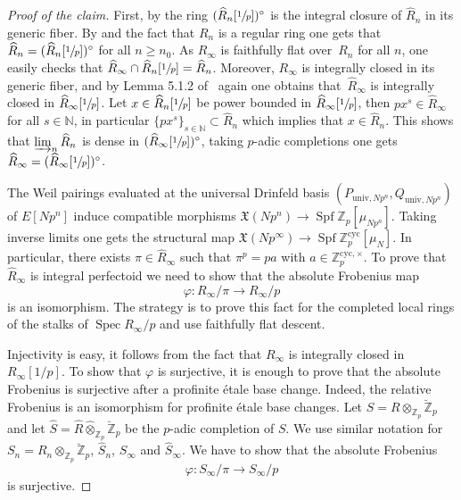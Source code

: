 \documentclass[JEP,XML,SOM,Unicode,published]{cedram}
\newcommand{\cyc}{\mathrm{cyc}}
\newcommand{\univ}{\mathrm{univ}}
\newcommand{\wotimes}{\mathbin{\widehat\otimes}}
\numberwithin{equation}{section}
\theoremstyle{definition}
\newcommand{\bb}[1]{\mathbb{#1}}
\newcommand{\f}[1]{\mathfrak{#1}}
\DeclareMathOperator{\Spf}{Spf}
\DeclareMathOperator{\Spec}{Spec}
\begin{document}
\begin{proof}[Proof of the claim]
First, by \cite[Lem.\,A.2.2.3]{Heuer2019PerfectoidGO} the ring $(\widehat{R}_n[\sfrac{1}{p}])^{\circ}$ is the integral closure of $\widehat{R}_n$ in its generic fiber. By \cite[Lem.\,5.1.2]{BhattLectures} and the fact that $R_n$ is a regular ring one gets that $\widehat{R}_n=(\widehat{R}_n[\sfrac{1}{p}])^{\circ}$ for all $n\geq n_0$. As $R_{\infty}$ is faithfully flat over~$R_n$ for all $n$, one easily checks that $\widehat{R}_{\infty}\cap \widehat{R}_n[\sfrac{1}{p}]=\widehat{R}_{n}$. Moreover, $R_{\infty}$ is integrally closed in its generic fiber, and by Lemma 5.1.2 of \loccit\ again one obtains that~$\widehat{R}_{\infty}$ is integrally closed in $\widehat{R}_{\infty}[\sfrac{1}{p}]$. Let $x\in \widehat{R}_n[\sfrac{1}{p}]$ be power bounded in $\widehat{R}_{\infty}[\sfrac{1}{p}]$, then $px^s\in \widehat{R}_{\infty}$ for all $s\in \bb{N}$, in particular $\{px^s\}_{s\in \bb{N}}\subset \widehat{R}_n$ which implies that $x\in \widehat{R}_n$. This shows that $\varinjlim_{n} \widehat{R}_n$ is dense in $(\widehat{R}_{\infty}[\sfrac{1}{p}])^{\circ}$, taking $p$-adic completions one gets $\widehat{R}_{\infty}=(\widehat{R}_{\infty}[\sfrac{1}{p}])^{\circ}$.

The Weil pairings evaluated at the universal Drinfeld basis $(P_{\univ,Np^n},Q_{\univ,Np^n})$ of $E[Np^n]$ induce compatible morphisms $\f{X}(Np^n)\to \Spf \bb{Z}_p[\mu_{Np^n}]$. Taking inverse limits one gets the structural map $\f{X}(Np^\infty)\to \Spf \bb{Z}_p^{\cyc}[\mu_N]$. In particular, there exists $\pi\in \widehat{R}_{\infty}$ such that $\pi^p=pa$ with $a\in \bb{Z}_p^{\cyc,\times}$. To prove that $\widehat{R}_{\infty}$ is integral perfectoid we need to show that the absolute Frobenius map\vspace*{-3pt}
\[
\varphi: R_{\infty}/\pi \to R_{\infty}/p
\]
is an isomorphism. The strategy is to prove this fact for the completed local rings of the stalks of $\Spec R_{\infty}/p$ and use faithfully flat descent.

Injectivity is easy, it follows from the fact that $R_{\infty}$ is integrally closed in $R_{\infty}[1/p]$. To show that $\varphi$ is surjective, it is enough to prove that the absolute Frobenius is surjective after a profinite étale base change. Indeed, the relative Frobenius is an isomorphism for profinite étale base changes. Let $S= R\otimes_{\bb{Z}_p} \breve{\bb{Z}}_p$ and let $\widehat{S}= \widehat{R}\wotimes_{\bb{Z}_p} \breve{\bb{Z}}_p$ be the $p$-adic completion of $S$. We use similar notation for $S_n= R_n\otimes_{\bb{Z}_p} \breve{\bb{Z}}_p$, $\widehat{S}_n$, $S_\infty$ and $\widehat{S}_{\infty}$. We have to show that the absolute Frobenius\vspace*{-3pt}
\begin{equation*}
\varphi: S_{\infty}/\pi\to S_{\infty}/p
\end{equation*}
is surjective.


\end{proof}
\end{document}
